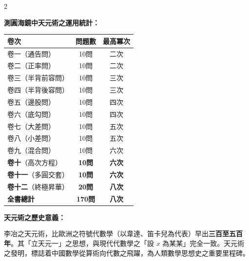 \documentclass[11pt,a4paper]{article}
\begin{document}
\begin{paracol}{2}

\begin{leftcolumn*}
\textbf{測圓海鏡中天元術之運用統計：}
\begin{center}
\begin{tabular}{l|c|c}
\textbf{卷次} & \textbf{問題數} & \textbf{最高冪次} \\
\hline
卷一（通告問） & 10問 & 二次 \\
卷二（正率問） & 10問 & 二次 \\
卷三（半背前容問） & 10問 & 三次 \\
卷四（半背後容問） & 10問 & 三次 \\
卷五（邊股問） & 10問 & 四次 \\
卷六（底勾問） & 10問 & 四次 \\
卷七（大差問） & 10問 & 五次 \\
卷八（小差問） & 10問 & 五次 \\
卷九（混合問） & 10問 & 六次 \\
\textbf{卷十}（高次方程） & \textbf{10問} & \textbf{六次} \\
\textbf{卷十一}（多圓交套） & \textbf{10問} & \textbf{六次} \\
\textbf{卷十二}（終極昇華） & \textbf{20問} & \textbf{八次} \\
\hline
\textbf{全書總計} & \textbf{170問} & \textbf{八次} \\
\hline
\end{tabular}
\end{center}

\vspace{0.3cm}

\textbf{天元術之歷史意義：}

李冶之天元術，比歐洲之符號代數學（以韋達、笛卡兒為代表）早出\textbf{三百至五百年}。其「立天元一」之思想，與現代代數學之「設 $x$ 為某某」完全一致。天元術之發明，標誌着中國數學從算術向代數之飛躍，為人類數學思想史之重要里程碑。
\end{leftcolumn*}


\end{paracol}
\end{document}
